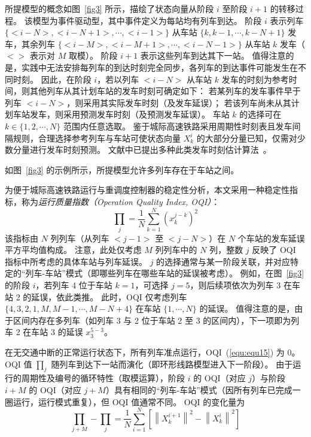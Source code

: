 所提模型的概念如图~\ref{fig3} 所示，描绘了状态向量从阶段 $i$ 至阶段 $i+1$ 的转移过程。
该模型为事件驱动型，其中事件定义为每站均有列车到达。
阶段 $i$ 表示列车 $\{<i-N>, <i-N+1>, \cdots, <i-1>\}$ 从车站 $\{k, k-1, \cdots, k-N+1\}$ 发车，其余列车 $\{<i-M>, <i-M+1>, \cdots, <i-N-1>\}$ 从车站 $k$ 发车（$<>$ 表示对 $M$ 取模）。
阶段 $i+1$ 表示这些列车到达其下一站。
值得注意的是，实践中无法安排每列车的到达时刻完全同步，各列车的到达事件可能发生在不同时刻。
因此，在阶段 $i$，若以列车 $<i-N>$ 从车站 $k$ 发车的时刻为参考时间，则其他列车从其计划车站的发车时刻可确定如下：
若某列车的发车事件早于列车 $<i-N>$，则采用其实际发车时刻（及发车延误）；
若该列车尚未从其计划车站发车，则采用预测发车时刻（及预测发车延误）。
车站 $k$ 的选择可在 $k \in\{1,2, \cdots, N\}$ 范围内任意选取。
鉴于城际高速铁路采用周期性时刻表且发车间隔规则，合理选择参考列车与车站可使状态向量 $X_{k}^{i}$ 的大部分分量已知，仅需对少数分量进行发车时刻预测。
文献中已提出多种此类发车时刻估计算法~\cite{b22}。

如图~\ref{fig3} 的示例所示，所提模型允许多列车存在于车站之间。

为便于城际高速铁路运行与重调度控制器的稳定性分析，本文采用一种稳定性指标，称为\emph{运行质量指数（Operation Quality Index, OQI）}：
\begin{equation}
    \prod_{j}=\frac{1}{N} \sum_{k=1}^{N}\left(x_{k}^{j-k}\right)^{2}
    \label{equ:equ15}
\end{equation}
该指标由 $N$ 列列车（从列车 $<j-1>$ 至 $<j-N>$）在 $N$ 个车站的发车延误平方平均值构成。
注意，此处仅考虑 $M$ 列列车中的 $N$ 列，整数 $j$ 反映了 OQI 指标中所考虑的具体车站与列车延误。
$j$ 的选择通常与某一阶段关联，并对应特定的“列车-车站”模式（即哪些列车在哪些车站的延误被考虑）。
例如，在图~\ref{fig3} 的阶段 $i$，若列车 4 位于车站 $k=1$，可选择 $j=5$，则后续项依次为列车 3 在车站 2 的延误，依此类推。
此时，OQI 仅考虑列车 $\{4, 3,2,1,M, M-1,\cdots, M-N+4\}$ 在车站 $\{1, \cdots, N\}$ 的延误。
值得注意的是，由于区间内存在多列车（如列车 3 与 2 位于车站 2 至 3 的区间内），下一项即为列车 2 在车站 3 的延误 $x_3^{5-3}$。

在无交通中断的正常运行状态下，所有列车准点运行，OQI~(\ref{equ:equ15}) 为 0。
OQI 值 $\prod_{j}$ 随列车到达下一站而演化（即环形线路模型进入下一阶段）。
由于运行的周期性及编号的循环特性（取模运算），阶段 $i$ 的 OQI（对应 $j$）与阶段 $i+M$ 的 OQI（对应 $j+M$）具有相同的“列车-车站”模式（因所有列车已完成一圈运行，运行模式重复），但 OQI 值通常不同。
OQI 的变化量为
\begin{equation*}
    \prod_{j+M}-\prod_{j}=\frac{1}{N} \sum_{i=1}^{N}\left[\left\|X_{k}^{i+1}\right\|^{2}-\left\|X_{k}^{i}\right\|^{2}\right]
\end{equation*}

